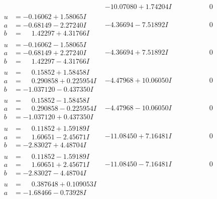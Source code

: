 \documentclass[1p]{elsarticle_modified}
\theoremstyle{definition}
\begin{document}
$$\begin{array}{c|c|c}
 & -10.07080 + 1.74204 I & \phantom{-0.000000 } 0 \\ \hline\begin{aligned}
u &= -0.16062 + 1.58065 I \\
a &= -0.68149 - 2.27240 I \\
b &= \phantom{-}1.42297 + 4.31766 I\end{aligned}
 & -4.36694 - 7.51892 I & \phantom{-0.000000 } 0 \\ \hline\begin{aligned}
u &= -0.16062 - 1.58065 I \\
a &= -0.68149 + 2.27240 I \\
b &= \phantom{-}1.42297 - 4.31766 I\end{aligned}
 & -4.36694 + 7.51892 I & \phantom{-0.000000 } 0 \\ \hline\begin{aligned}
u &= \phantom{-}0.15852 + 1.58458 I \\
a &= \phantom{-}0.290858 + 0.225954 I \\
b &= -1.037120 - 0.437350 I\end{aligned}
 & -4.47968 + 10.06050 I & \phantom{-0.000000 } 0 \\ \hline\begin{aligned}
u &= \phantom{-}0.15852 - 1.58458 I \\
a &= \phantom{-}0.290858 - 0.225954 I \\
b &= -1.037120 + 0.437350 I\end{aligned}
 & -4.47968 - 10.06050 I & \phantom{-0.000000 } 0 \\ \hline\begin{aligned}
u &= \phantom{-}0.11852 + 1.59189 I \\
a &= \phantom{-}1.60651 - 2.45671 I \\
b &= -2.83027 + 4.48704 I\end{aligned}
 & -11.08450 + 7.16481 I & \phantom{-0.000000 } 0 \\ \hline\begin{aligned}
u &= \phantom{-}0.11852 - 1.59189 I \\
a &= \phantom{-}1.60651 + 2.45671 I \\
b &= -2.83027 - 4.48704 I\end{aligned}
 & -11.08450 - 7.16481 I & \phantom{-0.000000 } 0 \\ \hline\begin{aligned}
u &= \phantom{-}0.387648 + 0.109053 I \\
a &= -1.68466 - 0.73928 I \\

\end{aligned}
\end{array}$$
\end{document}
